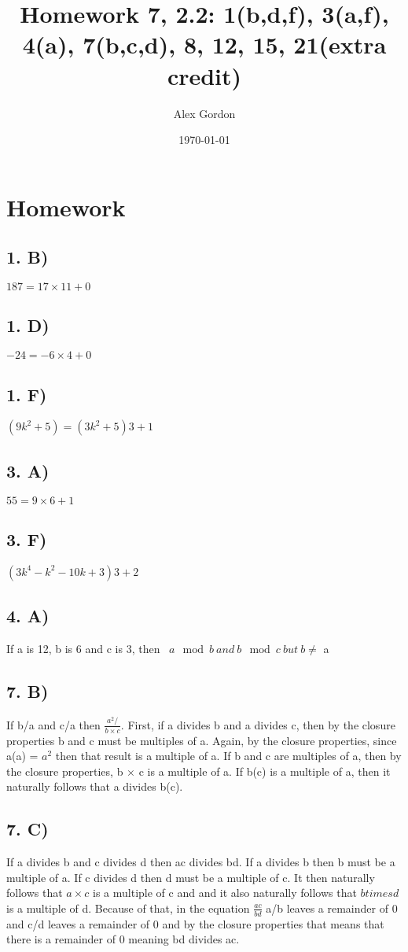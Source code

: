 \documentclass[12]{scrartcl}
\begin{document}
\title{Homework 7, 2.2: 1(b,d,f), 3(a,f), 4(a), 7(b,c,d), 8, 12, 15, 21(extra credit) }
\author{Alex Gordon}
\date{\today}
\maketitle
\section*{Homework}
\subsection*{1. B)}
$187 = 17 \times 11 + 0$
\subsection*{1. D)}
$-24 = -6 \times 4 + 0$
\subsection*{1. F)}
$(9k^2 + 5) = (3k^2 + 5)3 + 1 $
\subsection*{3. A)}
$55 = 9 \times 6 + 1$
\subsection*{3. F)}
$(3k^4 - k^2 - 10k + 3)3 + 2$
\subsection*{4. A)}
If a is 12, b is 6 and c is 3, then \ $a \mod b \ and \ b \mod c \ but \ b \neq$ a
\subsection*{7. B)}
If b/a and c/a then $\frac{a^2/}{b \times c}$. First, if a divides b and a divides c, then by the closure properties b and c must be multiples of a. Again, by the closure properties, since a(a) = $a^2$ then that result is a multiple of a. If b and c are multiples of a, then by the closure properties, b $\times$ c is a multiple of a. If b(c) is a multiple of a, then it naturally follows that a divides b(c).
\subsection*{7. C)}
If a divides b and c divides d then ac divides bd. If a divides b then b must be a multiple of a. If c divides d then d must be a multiple of c. It then naturally follows that $a \times c$ is a multiple of c and and it also naturally follows that  $b times d$ is a multiple of d. Because of that, in the equation $\frac{ac}{bd}$ a/b leaves a remainder of 0 and c/d leaves a remainder of 0 and by the closure properties that means that there is a remainder of 0 meaning bd divides ac. 	
\end{document}
